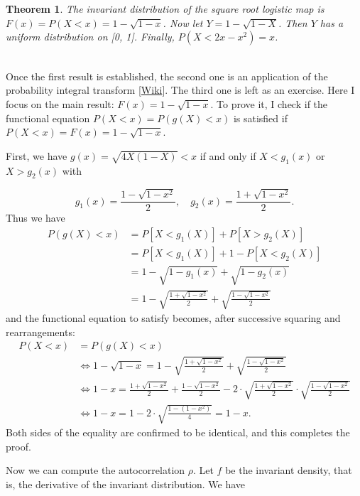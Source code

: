 \documentclass[oneside,10pt]{book}
\newtheorem{theorem}{Theorem}[section]
\newenvironment{proof}[1][Proof]{\begin{trivlist}
\item[\hskip \labelsep {\bfseries #1}]}{\end{trivlist}}
\newcommand{\qed}{\nobreak \ifvmode \relax \else
      \ifdim\lastskip<1.5em \hskip-\lastskip
      \hskip1.5em plus0em minus0.5em \fi \nobreak
      \vrule height0.75em width0.5em depth0.25em\fi}
\begin{document}
\begin{theorem}\label{thm87h}
The invariant distribution of
 the square root logistic map  is $F(x)=P(X < x) = 1 - \sqrt{1 - x}$. Now let $Y = 1 - \sqrt{1 - X}$. Then $Y$ has a uniform distribution on [0, 1]. Finally, $P(X < 2x - x^2) = x$.
\end{theorem}
\begin{proof}
\quad \\
Once the first result is established, the second one is an application of the
\textcolor{index}{probability integral transform}
 [\href{https://en.wikipedia.org/wiki/Probability_integral_transform}{Wiki}]. The third one is left as an exercise. Here I focus on the
 main result: $F(x)=1 - \sqrt{1 - x}$.  To prove it, I check if the
 \textcolor{index}{functional equation} $P(X<x) = P(g(X)<x)$ is satisfied if $P(X<x)=F(x)=1 - \sqrt{1 - x}$.

\noindent First, we have $g(x)=\sqrt{4X(1-X)}<x$  if and only if $X< g_1(x)$ or $X>g_2(x)$ with

$$g_1(x) = \frac{1-\sqrt{1-x^2}}{2}, \quad g_2(x) = \frac{1+\sqrt{1-x^2}}{2}.$$
Thus we have
\begin{align}
P(g(X)<x) & = P[X<g_1(X)] + P[X>g_2(X)] \nonumber \\
  & = P[X<g_1(X)] + 1 - P[X<g_2(X)] \nonumber \\
 & = 1 - \sqrt{1-g_1(x)} + \sqrt{1-g_2(x)} \nonumber \\
 & = 1 - \sqrt{\frac{1+\sqrt{1-x^2}}{2}} + \sqrt{\frac{1-\sqrt{1-x^2}}{2}} \nonumber
\end{align}
and the functional equation to satisfy becomes, after successive squaring and rearrangements:
\begin{align}
P(X<x) & = P(g(X)<x) \nonumber \\
 & \Leftrightarrow 1-\sqrt{1-x} = 1 - \sqrt{\frac{1+\sqrt{1-x^2}}{2}} + \sqrt{\frac{1-\sqrt{1-x^2}}{2}} \nonumber \\
 & \Leftrightarrow 1-x = \frac{1+\sqrt{1-x^2}}{2} + \frac{1-\sqrt{1-x^2}}{2}
 -2 \cdot \sqrt{\frac{1+\sqrt{1-x^2}}{2}} \cdot \sqrt{\frac{1-\sqrt{1-x^2}}{2}} \nonumber \\
& \Leftrightarrow 1-x = 1 - 2\cdot\sqrt{\frac{1-(1-x^2)}{4}} = 1-x.\nonumber
\end{align}
Both sides of the equality are confirmed to be identical, and this completes the proof. \qed
\end{proof}
Now we can compute the autocorrelation $\rho$. Let $f$ be the invariant density, that is, the derivative of the invariant distribution. We have
\end{document}
